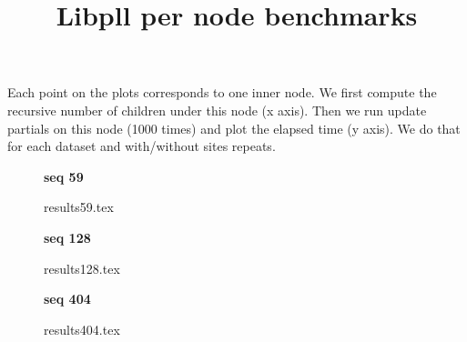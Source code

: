 \documentclass[a4paper]{article}
\begin{document}
\newcommand*{\figuretitle}[1]{%
    {\centering%
    \textbf{#1}%
    \par\medskip}%
}


\title{Libpll per node benchmarks}
\maketitle

Each point on the plots corresponds to one inner node. We first compute the recursive number of children under this node (x axis). Then we run update partials on this node (1000 times) and plot the elapsed time (y axis). We do that for each dataset and with/without sites repeats. 

\begin{figure}[!htb]
\figuretitle{seq 59}
{results59.tex}
\end{figure}
\begin{figure}[!htb]
\figuretitle{seq 128}
{results128.tex}
\end{figure}
\begin{figure}[!htb]
\figuretitle{seq 404}
{results404.tex}
\end{figure}
\end{document}
